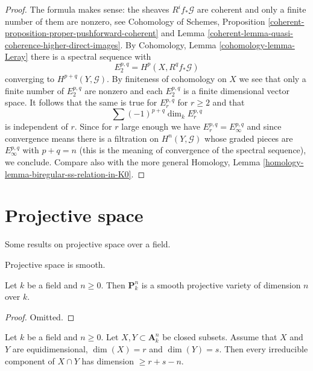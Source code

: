 \begin{proof}
The formula makes sense: the sheaves $R^if_*\mathcal{G}$ are coherent
and only a finite number of them are nonzero, see
Cohomology of Schemes,
Proposition \ref{coherent-proposition-proper-pushforward-coherent} and
Lemma \ref{coherent-lemma-quasi-coherence-higher-direct-images}.
By Cohomology, Lemma \ref{cohomology-lemma-Leray} there is a spectral
sequence with
$$
E_2^{p, q} = H^p(X, R^qf_*\mathcal{G})
$$
converging to $H^{p + q}(Y, \mathcal{G})$. By finiteness of cohomology
on $X$ we see that only a finite number of $E_2^{p, q}$ are nonzero
and each $E_2^{p, q}$ is a finite dimensional vector space. It follows
that the same is true for $E_r^{p, q}$ for $r \geq 2$ and that
$$
\sum (-1)^{p + q} \dim_k E_r^{p, q}
$$
is independent of $r$. Since for $r$ large enough we have
$E_r^{p, q} = E_\infty^{p, q}$ and since convergence means there
is a filtration on $H^n(Y, \mathcal{G})$ whose graded pieces are
$E_\infty^{p, q}$ with $p + q = n$ (this is the meaning of convergence
of the spectral sequence), we conclude.
Compare also with the more general
Homology, Lemma \ref{homology-lemma-biregular-ss-relation-in-K0}.
\end{proof}







\section{Projective space}
\label{section-projective-space}

\noindent
Some results on projective space over a field.

\begin{lemma}
\label{lemma-projective-space-smooth}
\begin{slogan}
Projective space is smooth.
\end{slogan}
Let $k$ be a field and $n \geq 0$. Then $\mathbf{P}^n_k$ is a
smooth projective variety of dimension $n$ over $k$.
\end{lemma}

\begin{proof}
Omitted.
\end{proof}

\begin{lemma}
\label{lemma-intersection-in-affine-space}
Let $k$ be a field and $n \geq 0$. Let $X, Y \subset \mathbf{A}^n_k$
be closed subsets. Assume that $X$ and $Y$ are equidimensional,
$\dim(X) = r$ and $\dim(Y) = s$.
Then every irreducible component of $X \cap Y$ has dimension $\geq r + s - n$.
\end{lemma}

